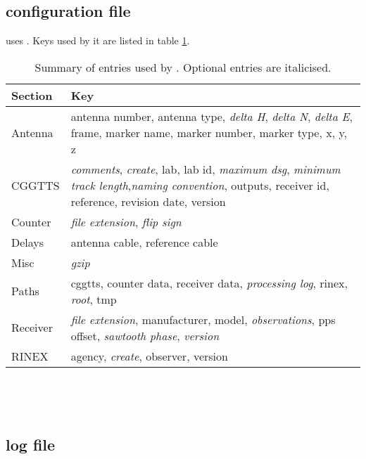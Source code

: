 \subsection{configuration file}

 uses .
Keys used by it are listed in table \ref{t:gpscvKeys}.

\begin{table}
\begin{tabular}{l|p{10cm}}
Section & Key \\ \hline
Antenna & antenna number, antenna type, \textit{delta H}, \textit{delta N},
         \textit{delta E}, frame, marker name, marker number, marker type, 
         x, y, z \\ \hline
CGGTTS  & \textit{comments}, \textit{create}, lab, lab id, 
         \textit{maximum dsg}, \textit{minimum track length},\textit{naming convention},
         outputs, receiver id, reference, revision date, version\\
Counter & \textit{file extension}, \textit{flip sign}\\ \hline
Delays  &  antenna cable, reference cable\\
Misc & \textit{gzip}\\
Paths & cggtts, counter data, receiver data, \textit{processing log},
        rinex, \textit{root}, tmp\\
Receiver & \textit{file extension}, manufacturer, model,
          \textit{observations}, pps offset, \textit{sawtooth phase},
          \textit{version}\\ \hline
RINEX & agency, \textit{create}, observer, version\\
\end{tabular}
\caption{Summary of  entries used by . Optional entries are italicised. \label{t:gpscvKeys}}
\end{table}

\begin{lstlisting}




\end{lstlisting}

\subsection{log file}
